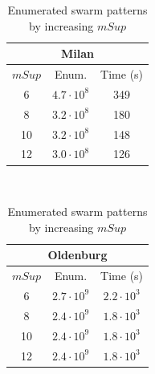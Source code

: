 \documentclass[preprint,12pt,authoryear]{elsarticle} %
\renewcommand{\sf}[1]{\textsf{\textup{#1}}}
\begin{document}
\begin{table}[t]
\scriptsize\centering
\caption{Enumerated swarm patterns by increasing $mSup$}
\label{tab:effsupp}%
\begin{tabular}{ccc}
\multicolumn{3}{c}{\sf{Milan}}\\
\toprule
$mSup$ &        Enum. & Time (s) \\
\midrule
     6 &  $4.7\cdot10^{8}$ &      349 \\
     8 &  $3.2\cdot10^{8}$ &      180 \\
    10 &  $3.2\cdot10^{8}$ &      148 \\
    12 &  $3.0\cdot10^{8}$ &      126 \\
\bottomrule
\end{tabular}
~
\begin{tabular}{ccc}
\multicolumn{3}{c}{\sf{Oldenburg}}\\
\toprule
$mSup$ &  Enum. &         Time (s) \\
\midrule
 6 &  $2.7\cdot10^{9}$ &  $2.2\cdot10^{3}$ \\
 8 &  $2.4\cdot10^{9}$ &  $1.8\cdot10^{3}$ \\
10 &  $2.4\cdot10^{9}$ &  $1.8\cdot10^{3}$ \\
12 &  $2.4\cdot10^{9}$ &  $1.8\cdot10^{3}$ \\
\bottomrule
\end{tabular}

\end{table}%
\end{document}
